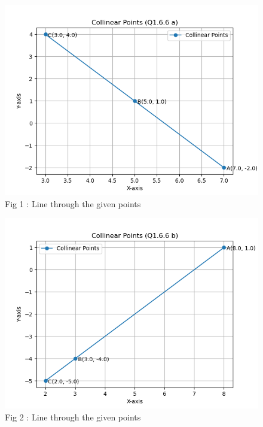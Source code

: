 \documentclass[journal,12pt,onecolumn]{IEEEtran}
\theoremstyle{remark}
\begin{document}
\pagebreak

\begin{figure}[h!]
  \centering
  \includegraphics[width=0.5\columnwidth]{figs/fig_a.png} 
   \caption*{Fig 1 : Line through the given points}
  \label{Fig1}
\end{figure}

\begin{figure}[h!]
  \centering
  \includegraphics[width=0.5\columnwidth]{figs/fig_b.png} 
   \caption*{Fig 2 : Line through the given points}
  \label{Fig2}
\end{figure}
\end{document}
